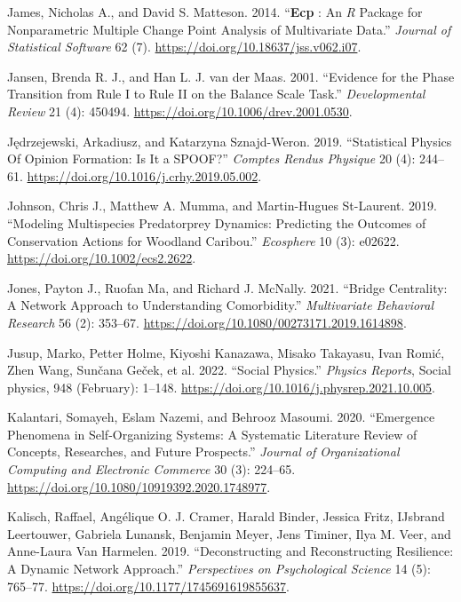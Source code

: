 \documentclass[
  a4paper,
  DIV=11,
  numbers=noendperiod,
  oneside]{scrreprt}
\newlength{\cslhangindent}
\newenvironment{CSLReferences}[2] %
 {\begin{list}{}{%
  \setlength{\itemindent}{0pt}
  \setlength{\leftmargin}{0pt}
  \setlength{\parsep}{0pt}
  \ifodd #1
   \setlength{\leftmargin}{\cslhangindent}
   \setlength{\itemindent}{-1\cslhangindent}
  \fi
  \setlength{\itemsep}{#2\baselineskip}}}
 {\end{list}}
\begin{document}
\begin{CSLReferences}{1}{0}
James, Nicholas A., and David S. Matteson. 2014. {``{\textbf{Ecp}} :
{An} {\emph{R}} {Package} for {Nonparametric Multiple Change Point
Analysis} of {Multivariate Data}.''} \emph{Journal of Statistical
Software} 62 (7). \url{https://doi.org/10.18637/jss.v062.i07}.

Jansen, Brenda R. J., and Han L. J. van der Maas. 2001. {``Evidence for
the Phase Transition from Rule I to Rule II on the Balance Scale
Task.''} \emph{Developmental Review} 21 (4): 450494.
\url{https://doi.org/10.1006/drev.2001.0530}.

Jędrzejewski, Arkadiusz, and Katarzyna Sznajd-Weron. 2019.
{``Statistical {Physics Of Opinion Formation}: {Is} It a {SPOOF}?''}
\emph{Comptes Rendus Physique} 20 (4): 244--61.
\url{https://doi.org/10.1016/j.crhy.2019.05.002}.

Johnson, Chris J., Matthew A. Mumma, and Martin-Hugues St-Laurent. 2019.
{``Modeling Multispecies Predator\textendash prey Dynamics: Predicting
the Outcomes of Conservation Actions for Woodland Caribou.''}
\emph{Ecosphere} 10 (3): e02622.
\url{https://doi.org/10.1002/ecs2.2622}.

Jones, Payton J., Ruofan Ma, and Richard J. McNally. 2021. {``Bridge
{Centrality}: {A Network Approach} to {Understanding Comorbidity}.''}
\emph{Multivariate Behavioral Research} 56 (2): 353--67.
\url{https://doi.org/10.1080/00273171.2019.1614898}.

Jusup, Marko, Petter Holme, Kiyoshi Kanazawa, Misako Takayasu, Ivan
Romić, Zhen Wang, Sunčana Geček, et al. 2022. {``Social Physics.''}
\emph{Physics Reports}, Social physics, 948 (February): 1--148.
\url{https://doi.org/10.1016/j.physrep.2021.10.005}.

Kalantari, Somayeh, Eslam Nazemi, and Behrooz Masoumi. 2020.
{``Emergence Phenomena in Self-Organizing Systems: A Systematic
Literature Review of Concepts, Researches, and Future Prospects.''}
\emph{Journal of Organizational Computing and Electronic Commerce} 30
(3): 224--65. \url{https://doi.org/10.1080/10919392.2020.1748977}.

Kalisch, Raffael, Angélique O. J. Cramer, Harald Binder, Jessica Fritz,
IJsbrand Leertouwer, Gabriela Lunansk, Benjamin Meyer, Jens Timiner,
Ilya M. Veer, and Anne-Laura Van Harmelen. 2019. {``Deconstructing and
Reconstructing Resilience: A Dynamic Network Approach.''}
\emph{Perspectives on Psychological Science} 14 (5): 765--77.
\url{https://doi.org/10.1177/1745691619855637}.


\end{CSLReferences}
\end{document}
